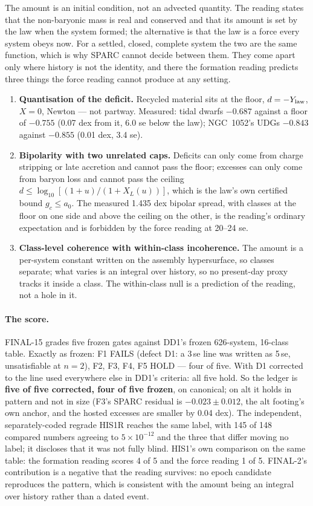 \documentclass[10pt]{article}
\begin{document}
The amount is an initial condition, not an advected quantity. The reading states that the non-baryonic mass is
real and conserved and that its amount is set by the law when the system formed; the alternative is that the law
is a force every system obeys now. For a settled, closed, complete system the two are the same function, which
is why SPARC cannot decide between them. They come apart only where history is not the identity, and there the
formation reading predicts three things the force reading cannot produce at any setting.

\begin{enumerate}
\item \textbf{Quantisation of the deficit.} Recycled material sits at the floor, $d=-Y_{\rm law}$, $X=0$,
  Newton --- not partway. Measured: tidal dwarfs $-0.687$ against a floor of $-0.755$ (0.07 dex from it, 6.0 se
  below the law); NGC~1052's UDGs $-0.843$ against $-0.855$ (0.01 dex, 3.4 se).
\item \textbf{Bipolarity with two unrelated caps.} Deficits can only come from charge stripping or late accretion
  and cannot pass the floor; excesses can only come from baryon loss and cannot pass the ceiling
  $d\le\log_{10}[(1+u)/(1+X_L(u))]$, which is the law's own certified bound $g_c\le a_0$. The measured 1.435 dex
  bipolar spread, with classes at the floor on one side and above the ceiling on the other, is the reading's
  ordinary expectation and is forbidden by the force reading at 20--24 se.
\item \textbf{Class-level coherence with within-class incoherence.} The amount is a per-system constant written
  on the assembly hypersurface, so classes separate; what varies is an integral over history, so no
  present-day proxy tracks it inside a class. The within-class null is a prediction of the reading, not a hole
  in it.
\end{enumerate}

\paragraph{The score.} FINAL-15 grades five frozen gates against DD1's frozen 626-system, 16-class table.
Exactly as frozen: F1 FAILS (defect D1: a 3\,se line was written as 5\,se, unsatisfiable at $n=2$), F2, F3, F4,
F5 HOLD --- four of five. With D1 corrected to the line used everywhere else in DD1's criteria: all five hold.
So the ledger is {\bf five of five corrected, four of five frozen}, on canonical; on alt it holds in pattern and
not in size (F3's SPARC residual is $-0.023\pm0.012$, the alt footing's own anchor, and the hosted excesses are
smaller by 0.04 dex). The independent, separately-coded regrade HIS1R reaches the same label, with 145 of 148
compared numbers agreeing to $5\times10^{-12}$ and the three that differ moving no label; it discloses that it
was not fully blind. HIS1's own comparison on the same table: the formation reading scores 4 of 5 and the force
reading 1 of 5. FINAL-2's contribution is a negative that the reading survives: no epoch candidate reproduces
the pattern, which is consistent with the amount being an integral over history rather than a dated event.
\end{document}
